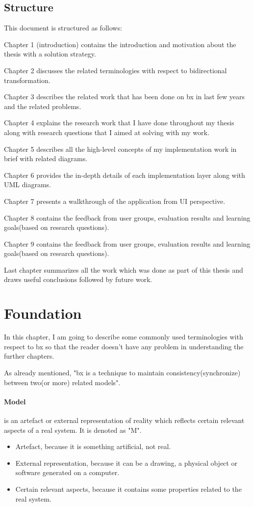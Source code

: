 \subsection{Structure}\label{subsec:structure}
This document is structured as follows: 

Chapter 1 (introduction) contains the introduction and motivation about the thesis with a solution strategy.

Chapter 2 discusses the related terminologies with respect to bidirectional transformation.

Chapter 3 describes the related work that has been done on bx in last few years and the related problems.

Chapter 4 explains the research work that I have done throughout my thesis along with research questions that I aimed at solving with my work.

Chapter 5 describes all the high-level concepts of my implementation work in brief with related diagrams.

Chapter 6 provides the in-depth details of each implementation layer along with UML diagrams.

Chapter 7 presents a walkthrough of the application from UI perspective.

Chapter 8 contains the feedback from user groups, evaluation results and learning goals(based on research questions).

Chapter 9 contains the feedback from user groups, evaluation results and learning goals(based on research questions).

Last chapter summarizes all the work which was done as part of this thesis and draws useful conclusions followed by future work.

\section{Foundation}\label{sec:foundation}
In this chapter, I am going to describe some commonly used terminologies with respect to bx so that the reader doesn't have any problem in understanding the further chapters.

As already mentioned, "bx is a technique to maintain consistency(synchronize) between two(or more) related models".

\paragraph{Model}is an artefact or external representation of reality which reflects certain relevant aspects of a real system. It is denoted as "M".
\begin{itemize}
\item {Artefact, because it is something artificial, not real.}
\item {External representation, because it can be a drawing, a physical object or software generated on a computer.}
\item {Certain relevant aspects, because it contains some properties related to the real system.}
\end{itemize}
